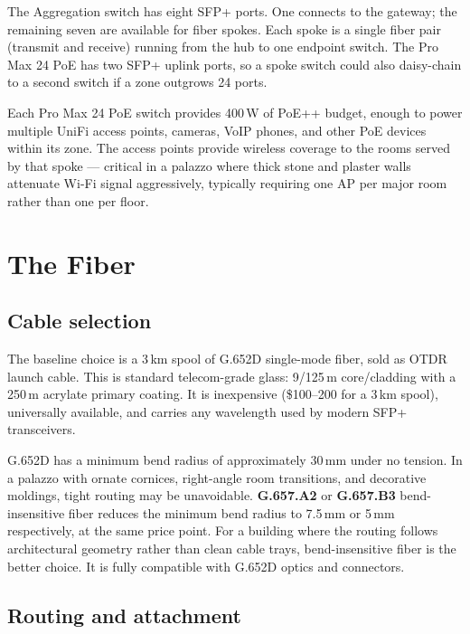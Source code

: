 \documentclass[10pt, letterpaper]{article}
\begin{document}
The Aggregation switch has eight SFP+ ports. One connects to the gateway; the remaining seven are available for fiber spokes. Each spoke is a single fiber pair (transmit and receive) running from the hub to one endpoint switch. The Pro Max 24 PoE has two SFP+ uplink ports, so a spoke switch could also daisy-chain to a second switch if a zone outgrows 24 ports.

Each Pro Max 24 PoE switch provides 400\,W of PoE++ budget, enough to power multiple UniFi access points, cameras, VoIP phones, and other PoE devices within its zone. The access points provide wireless coverage to the rooms served by that spoke --- critical in a palazzo where thick stone and plaster walls attenuate Wi-Fi signal aggressively, typically requiring one AP per major room rather than one per floor.

\section{The Fiber}

\subsection{Cable selection}

The baseline choice is a 3\,km spool of G.652D single-mode fiber, sold as OTDR launch cable. This is standard telecom-grade glass: 9/125\,\textmu m core/cladding with a 250\,\textmu m acrylate primary coating. It is inexpensive (\$100--200 for a 3\,km spool), universally available, and carries any wavelength used by modern SFP+ transceivers.

\begin{callout}[title=Bend radius consideration]
G.652D has a minimum bend radius of approximately 30\,mm under no tension. In a palazzo with ornate cornices, right-angle room transitions, and decorative moldings, tight routing may be unavoidable. \textbf{G.657.A2} or \textbf{G.657.B3} bend-insensitive fiber reduces the minimum bend radius to 7.5\,mm or 5\,mm respectively, at the same price point. For a building where the routing follows architectural geometry rather than clean cable trays, bend-insensitive fiber is the better choice. It is fully compatible with G.652D optics and connectors.
\end{callout}

\subsection{Routing and attachment}
\end{document}
